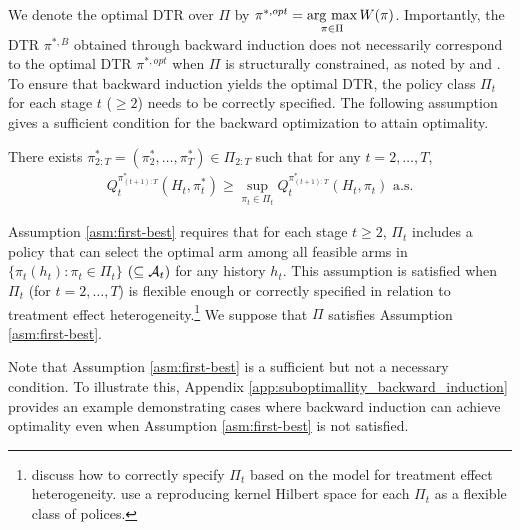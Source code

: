 We denote the optimal DTR over $\Pi$ by $\pi^{\ast,opt} = \mathop{\rm arg~max}\limits_{\pi \in \Pi} W(\pi)$. Importantly, the DTR $\pi^{\ast,B}$ obtained through backward induction does not necessarily correspond to the optimal DTR $\pi^{\ast,opt}$ when $\Pi$ is structurally constrained, as noted by \cite{Li_et_al_2023} and \cite{Sakaguchi_2021}. 
To ensure that backward induction yields the optimal DTR, the policy class $\Pi_t$ for each stage $t$ ($\geq 2$) needs to be correctly specified. The following assumption gives a sufficient condition for the backward optimization to attain optimality.

\medskip

\begin{assumption} 
\label{asm:first-best} 
There exists $\pi_{2:T}^{\ast} = (\pi_{2}^{\ast},\ldots,\pi_{T}^{\ast})\in \Pi_{2:T}$ such that for any $t=2,\ldots,T$,
\begin{align*}
Q_{t}^{\pi_{(t+1):T}^{\ast}}\left(H_t,\pi_{t}^{\ast}\right) \geq \sup_{\pi_{t} \in \Pi_t}Q_{t}^{\pi_{(t+1):T}^{\ast}}\left(H_t,\pi_{t}\right) \mbox{\ a.s.}
\end{align*} 
\end{assumption}

\medskip

Assumption \ref{asm:first-best} requires that for each stage $t \geq 2$, $\Pi_t$ includes a policy that can select the optimal arm among all feasible arms in $\{\pi_{t}(h_t):\pi_{t} \in \Pi_t\}$ $(\subseteq \mathcal{A}_{t})$ for any history $h_t$. This assumption is satisfied when $\Pi_t$ (for $t=2,\ldots,T$) is flexible enough or correctly specified in relation to treatment effect heterogeneity.\footnote{ \cite{Zhang_et_2013} discuss how to correctly specify $\Pi_t$ based on the model for treatment effect heterogeneity. \cite{Zhao_et_al_2015} use a reproducing kernel Hilbert space for each $\Pi_t$ as a flexible class of polices.} We suppose that $\Pi$ satisfies Assumption \ref{asm:first-best}. 

Note that Assumption \ref{asm:first-best} is a sufficient but not a necessary condition. %
To illustrate this, Appendix \ref{app:suboptimallity_backward_induction} provides an example demonstrating cases where backward induction can achieve optimality even when Assumption \ref{asm:first-best} is not satisfied.

